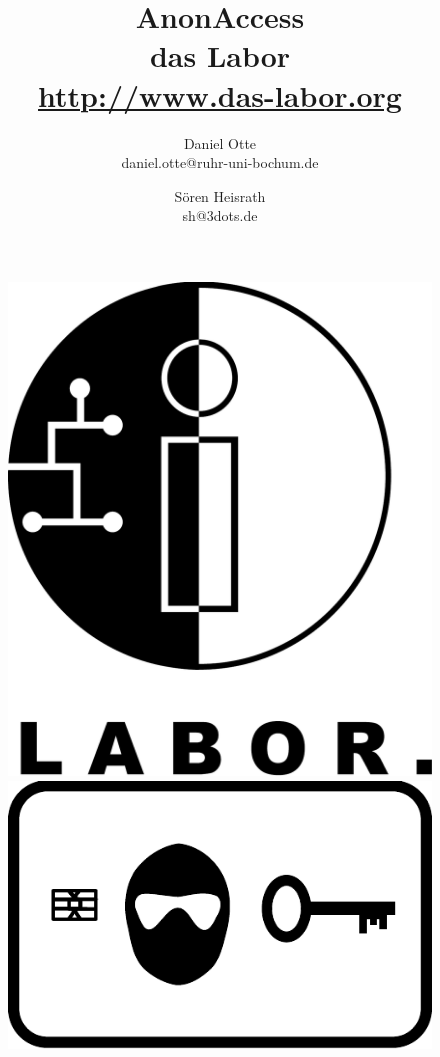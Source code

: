 \documentclass[10pt,a4paper]{article}
\author{Daniel Otte\\daniel.otte@ruhr-uni-bochum.de \and Sören Heisrath\\sh@3dots.de }
\title{\Huge{\textsf{AnonAccess}} \\ \normalsize{das Labor \\ \url{http://www.das-labor.org}}}
\begin{document}
 

\begin{figure}[t]
 \begin{minipage}[b]{.3\linewidth}
 \includegraphics[scale=0.15]{Labor} 
 \end{minipage}
 \hspace{0.3\linewidth}
 \begin{minipage}[b]{.3\linewidth}
 \includegraphics[scale=0.7]{AnonAccessLogo} 
 \end{minipage}
\end{figure}
\end{document}
